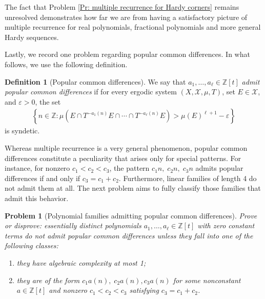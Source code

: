 \documentclass[11pt]{amsart}
\newtheorem{problem}{Problem}
\theoremstyle{definition}
\newtheorem{definition}[lemma]{Definition}
\let\ringaccent\r
\def\aa{\ringaccent a}
\def\aa{\ringaccent a}
\newcommand{\Z}{{\mathbb Z}}
\newcommand{\CX}{{\mathcal X}}
\renewcommand{\r}{{\mathbf{r}}}
\newcommand{\veps}{\varepsilon}
\newcommand{\1}{{\mathbf{1}}}
\newcommand{\rem}[1]{\left \{ #1 \right \}}
\begin{document}
%
%
The fact that Problem \ref{Pr: multiple recurrence for Hardy corners}  remains unresolved demonstrates how far we are from having a satisfactory picture of multiple recurrence for real polynomials, fractional polynomials and more general Hardy sequences.



Lastly, we record one problem regarding popular common differences. In what follows, we use the following definition.
\begin{definition}[Popular common differences]
    We say that $a_1, \ldots, a_\ell\in\Z[t]$ \emph{admit popular common differences} if for every ergodic system $(X, \CX, \mu, T)$, set $E\in\CX$, and $\veps>0$, the set
    \begin{align*}
        \rem{n\in\Z\colon \mu(E\cap T^{-a_1(n)}E\cap \cdots \cap T^{-a_\ell(n)}E) > \mu(E)^{\ell+1}-\veps}
    \end{align*}
    is syndetic.
\end{definition}
Whereas multiple recurrence is a very general phenomenon, popular common differences constitute a peculiarity that arises only for special patterns. For instance, for nonzero $c_1<c_2<c_3$, the pattern $c_1n,\; c_2n,\; c_3n$ admits popular differences if and only if $c_3=c_1+c_2$. Furthermore, linear families of length 4 do not admit them at all. The next problem aims to fully classify those families that admit this behavior.
\begin{problem}[Polynomial families admitting popular common differences]\label{Pr: popular common differences}
Prove or disprove: essentially distinct polynomials $a_1, \ldots, a_\ell\in\Z[t]$ with zero constant terms do not admit popular common differences unless they fall into one of the following classes:
    \begin{enumerate}
        \item they have algebraic complexity at most 1;
        \item they are of the form $c_1 a(n),\; c_2 a(n), c_3 a(n)$ for some nonconstant $a\in\Z[t]$ and nonzero $c_1<c_2<c_3$ satisfying $c_3=c_1+c_2$.
    \end{enumerate}
\end{problem}
\end{document}
